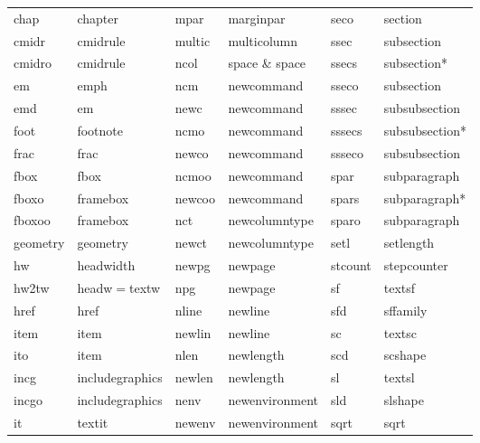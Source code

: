 \documentclass[11pt,french]{article}
\begin{document}
\begin{table}
{\begin{tabular}{llllll}
chap             & chapter           & mpar       & marginpar      & seco            & section \\
cmidr            & cmidrule          & multic     & multicolumn    & ssec            & subsection \\
cmidro           & cmidrule          & ncol       & space \& space & ssecs           & subsection* \\
em               & emph              & ncm        & newcommand     & sseco           & subsection \\ 
emd              & em                & newc       & newcommand     & sssec           & subsubsection \\
foot             & footnote          & ncmo       & newcommand     & sssecs          & subsubsection* \\
frac             & frac              & newco      & newcommand     & ssseco          & subsubsection \\
fbox             & fbox              & ncmoo      & newcommand     & spar            & subparagraph \\
fboxo            & framebox          & newcoo     & newcommand     & spars           & subparagraph* \\
fboxoo           & framebox          & nct        & newcolumntype  & sparo           & subparagraph \\
geometry         & geometry          & newct      & newcolumntype  & setl            & setlength \\
hw               & headwidth         & newpg      & newpage        & stcount         & stepcounter \\
hw2tw            & headw\(=\)textw   & npg        & newpage        & sf              & textsf \\
href             & href              & nline      & newline        & sfd             & sffamily \\
item             & item              & newlin     & newline        & sc              & textsc \\
ito              & item              & nlen       & newlength      & scd             & scshape \\
incg             & includegraphics   & newlen     & newlength      & sl              & textsl \\
incgo            & includegraphics   & nenv       & newenvironment & sld             & slshape \\
it               & textit            & newenv     & newenvironment & sqrt            & sqrt \\

\end{tabular}}
\end{table}
\end{document}
